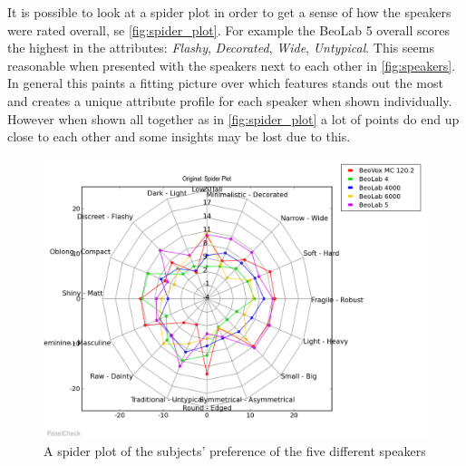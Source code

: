 It is possible to look at a spider plot in order to get a sense of how the speakers were rated overall, se \autoref{fig:spider_plot}. For example the BeoLab 5 overall scores the highest in the attributes: \textit{Flashy}, \textit{Decorated}, \textit{Wide}, \textit{Untypical}. This seems reasonable when presented with the speakers next to each other in \autoref{fig:speakers}. In general this paints a fitting picture over which features stands out the most and creates a unique attribute profile for each speaker when shown individually. However when shown all together as in \autoref{fig:spider_plot} a lot of points do end up close to each other and some insights may be lost due to this.

\begin{figure}[H]
\centering
\includegraphics[width = \textwidth]{Figure/spider_plot.png}
\caption{A spider plot of the subjects' preference of the five different speakers}
\label{fig:spider_plot}
\end{figure}